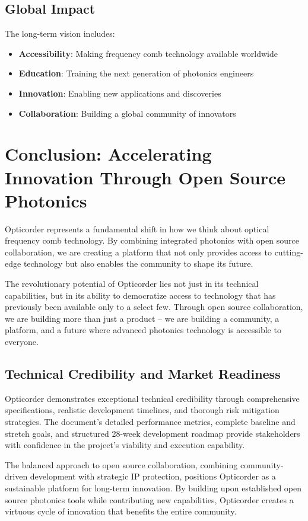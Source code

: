 \documentclass[11pt,a4paper]{article}
\begin{document}
\subsection{Global Impact}
The long-term vision includes:
\begin{itemize}
\item \textbf{Accessibility}: Making frequency comb technology available worldwide
\item \textbf{Education}: Training the next generation of photonics engineers
\item \textbf{Innovation}: Enabling new applications and discoveries
\item \textbf{Collaboration}: Building a global community of innovators
\end{itemize}

\section{Conclusion: Accelerating Innovation Through Open Source Photonics}

Opticorder represents a fundamental shift in how we think about optical frequency comb technology. By combining integrated photonics with open source collaboration, we are creating a platform that not only provides access to cutting-edge technology but also enables the community to shape its future.

The revolutionary potential of Opticorder lies not just in its technical capabilities, but in its ability to democratize access to technology that has previously been available only to a select few. Through open source collaboration, we are building more than just a product – we are building a community, a platform, and a future where advanced photonics technology is accessible to everyone.

\subsection{Technical Credibility and Market Readiness}
Opticorder demonstrates exceptional technical credibility through comprehensive specifications, realistic development timelines, and thorough risk mitigation strategies. The document's detailed performance metrics, complete baseline and stretch goals, and structured 28-week development roadmap provide stakeholders with confidence in the project's viability and execution capability.

The balanced approach to open source collaboration, combining community-driven development with strategic IP protection, positions Opticorder as a sustainable platform for long-term innovation. By building upon established open source photonics tools while contributing new capabilities, Opticorder creates a virtuous cycle of innovation that benefits the entire community.
\end{document}
